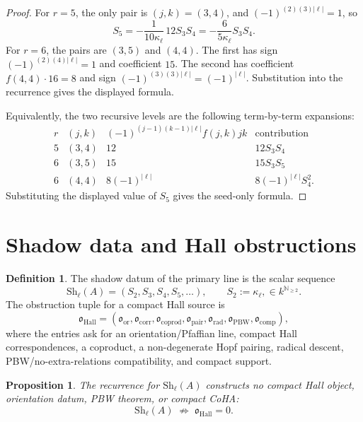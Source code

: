 \documentclass[11pt]{amsart}
\newtheorem{proposition}[theorem]{Proposition}
\theoremstyle{definition}
\newtheorem{definition}[theorem]{Definition}
\theoremstyle{remark}
\begin{document}
\begin{proof}
For \(r=5\), the only pair is \((j,k)=(3,4)\), and
\((-1)^{(2)(3)|\ell|}=1\), so
\[
        S_5=-\frac{1}{10\kappa_\ell}\,12S_3S_4
        =-\frac{6}{5\kappa_\ell}S_3S_4 .
\]
For \(r=6\), the pairs are \((3,5)\) and \((4,4)\). The first has sign
\((-1)^{(2)(4)|\ell|}=1\) and coefficient \(15\). The second has
coefficient \(f(4,4)\cdot16=8\) and sign
\((-1)^{(3)(3)|\ell|}=(-1)^{|\ell|}\). Substitution into the recurrence
gives the displayed formula.

Equivalently, the two recursive levels are the following term-by-term
expansions:
\[
\begin{array}{c|c|c|c}
r & (j,k) & (-1)^{(j-1)(k-1)|\ell|}f(j,k)jk & \text{contribution}\\
\hline
5 & (3,4) & 12 & 12S_3S_4\\
6 & (3,5) & 15 & 15S_3S_5\\
6 & (4,4) & 8(-1)^{|\ell|} & 8(-1)^{|\ell|}S_4^2 .
\end{array}
\]
Substituting the displayed value of \(S_5\) gives the seed-only formula.
\end{proof}

\section{Shadow data and Hall obstructions}

\begin{definition}
The shadow datum of the primary line is the scalar sequence
\[
        \mathrm{Sh}_\ell(A)
        =
        (S_2,S_3,S_4,S_5,\ldots),
        \qquad S_2:=\kappa_\ell,
        \in k^{\mathbb N_{\geq2}} .
\]
The obstruction tuple for a compact Hall source is
\[
        \mathfrak{o}_{\mathrm{Hall}}
        =
        (\mathfrak{o}_{\mathrm{or}},
         \mathfrak{o}_{\mathrm{corr}},
         \mathfrak{o}_{\mathrm{coprod}},
         \mathfrak{o}_{\mathrm{pair}},
         \mathfrak{o}_{\mathrm{rad}},
         \mathfrak{o}_{\mathrm{PBW}},
         \mathfrak{o}_{\mathrm{comp}}),
\]
where the entries ask for an orientation/Pfaffian line, compact Hall
correspondences, a coproduct, a non-degenerate Hopf pairing, radical
descent, PBW/no-extra-relations compatibility, and compact support.
\end{definition}

\begin{proposition}
The recurrence for \(\mathrm{Sh}_\ell(A)\) constructs no compact Hall
object, orientation datum, PBW theorem, or compact CoHA:
\[
        \mathrm{Sh}_\ell(A)
        \;\not\Longrightarrow\;
        \mathfrak{o}_{\mathrm{Hall}}=0 .
\]
\end{proposition}
\end{document}
